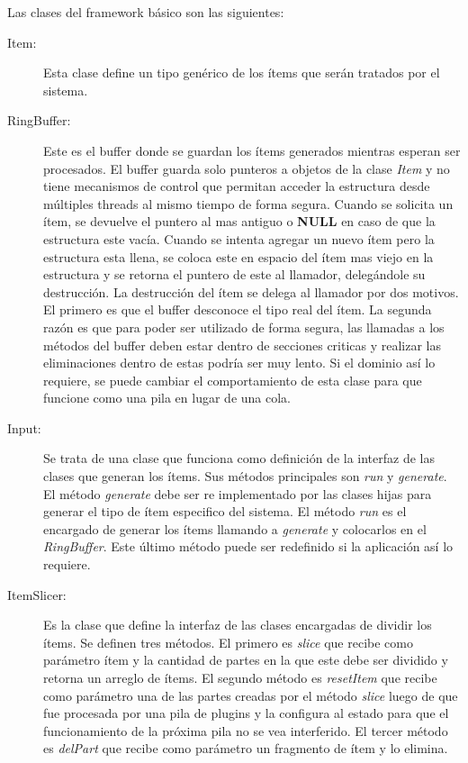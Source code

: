 Las clases del framework básico son las siguientes:

\begin{description}

\item[Item:] Esta clase define un tipo genérico de los ítems que serán tratados
	por el sistema.

\item[RingBuffer:] Este es el buffer donde se guardan los ítems generados
	mientras esperan ser procesados. El buffer guarda solo punteros a
	objetos de la clase \emph{Item} y no tiene mecanismos de control que
	permitan acceder la estructura desde múltiples threads al mismo tiempo
	de forma segura. Cuando se solicita un ítem, se devuelve el puntero al
	mas antiguo o \textbf{NULL} en caso de que la estructura este vacía.
	Cuando se intenta agregar un nuevo ítem pero la estructura esta llena,
	se coloca este en espacio del ítem mas viejo en la estructura y se
	retorna el puntero de este al llamador, delegándole su destrucción. La
	destrucción del ítem se delega al llamador por dos motivos. El primero
	es que el buffer desconoce el tipo real del ítem. La segunda razón es
	que para poder ser utilizado de forma segura, las llamadas a los métodos
	del buffer deben estar dentro de secciones criticas y realizar las
	eliminaciones dentro de estas podría ser muy lento. Si el dominio así
	lo requiere, se puede cambiar el comportamiento de esta clase para que
	funcione como una pila en lugar de una cola.

\item[Input:] Se trata de una clase que funciona como definición de la interfaz
	de las clases que generan los ítems. Sus métodos principales son
	\emph{run} y \emph{generate}. El método \emph{generate} debe ser re
	implementado por las clases hijas para generar el tipo de ítem
	especifico del sistema. El método \emph{run} es el encargado de generar
	los ítems llamando a \emph{generate} y colocarlos en el
	\emph{RingBuffer}. Este último método puede ser redefinido si la
	aplicación así lo requiere.

\item[ItemSlicer:] Es la clase que define la interfaz de las clases encargadas
	de dividir los ítems. Se definen tres métodos. El primero es
	\emph{slice} que recibe como parámetro ítem y la cantidad de partes en
	la que este debe ser dividido y retorna un arreglo de ítems. El segundo
	método es \emph{resetItem} que recibe como parámetro una de las partes
	creadas por el método \emph{slice} luego de que fue procesada por una
	pila de plugins y la configura al estado para que el funcionamiento de
	la próxima pila no se vea interferido. El tercer método es
	\emph{delPart} que recibe como parámetro un fragmento de ítem y lo
	elimina.


\end{description}
